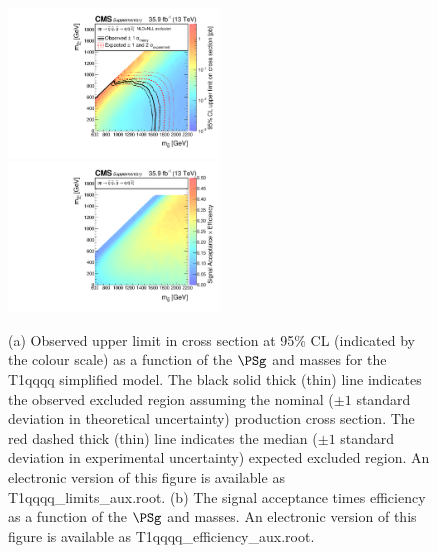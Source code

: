 \clearpage
\begin{figure}
    \begin{center}
            \includegraphics[width=0.50\textwidth]{Supplementary/CMS-SUS-16-038_Figure-aux_015-a}
            \includegraphics[width=0.50\textwidth]{Supplementary/CMS-SUS-16-038_Figure-aux_015-b}
        \caption{ (a) Observed upper limit in cross section at 95\% CL (indicated
        by the colour scale) as a function of 
        the $\PSg$ and \PSGczDo %
        masses for the 
        T1qqqq %
        simplified  model.  The  black  solid thick  (thin)  line indicates  the
        observed  excluded  region  assuming   the  nominal  (${\pm}1$  standard
        deviation in theoretical uncertainty)  production cross section. The red
        dashed  thick  (thin)  line  indicates  the  median  (${\pm}1$  standard
        deviation in experimental uncertainty) expected excluded region.
    An electronic version of this figure is available as T1qqqq\_limits\_aux.root.
        (b) The signal acceptance times efficiency as a function of 
        the $\PSg$ and \PSGczDo %
        masses.
    An electronic version of this figure is available as T1qqqq\_efficiency\_aux.root.
        }
        \label{fig:T1qqqq}
    \end{center}
\end{figure}

